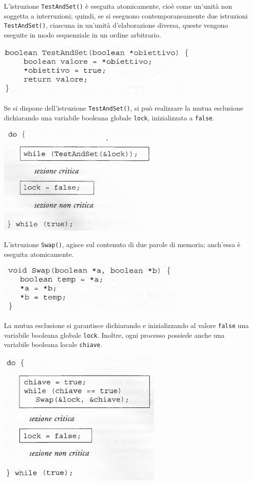 \documentclass[11pt,a4paper]{article}
\begin{document}
L'istruzione \texttt{TestAndSet()} è eseguita atomicamente, cioè come un'unità non soggetta a interruzioni; quindi,
se si eseguono contemporaneamente due istruzioni \texttt{TestAndSet()}, ciascuna in un'unità
d'elaborazione diversa, queste vengono eseguite in modo sequenziale in un ordine arbitra­rio.
\begin{center}
  \includegraphics[scale=0.6]{img/0024.png}
\end{center}
Se si dispone dell'istruzione \texttt{TestAndSet()}, si può realizzare la mutua esclusione di­chiarando una variabile booleana globale \texttt{lock}, inizializzata a \texttt{false}.
\begin{center}
  \includegraphics[scale=0.6]{img/0025.png}
\end{center}

L'istruzione \texttt{Swap()}, agisce sul contenuto di due parole di
memoria; anch'essa è eseguita atomicamente.
\begin{center}
  \includegraphics[scale=0.6]{img/0026.png}
\end{center}
La mutua esclusione si garantisce dichiarando e inizializzando al
valore \texttt{false} una variabile booleana globale \texttt{lock}. Inoltre, ogni processo possiede anche una
variabile booleana locale \texttt{chiave}.
\begin{center}
  \includegraphics[scale=0.6]{img/0027.png}
\end{center}
\end{document}
